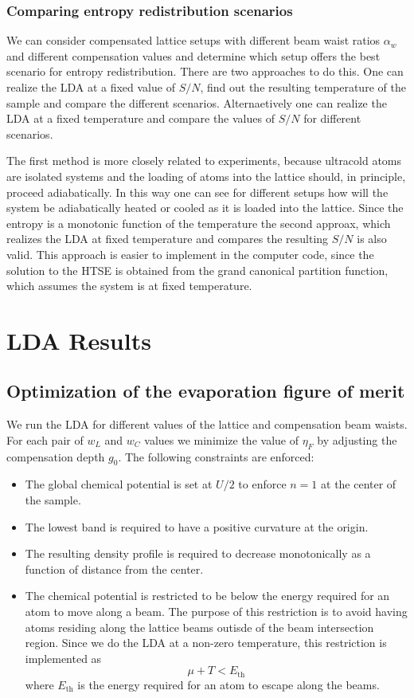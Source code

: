 \documentclass[11pt,letter]{article}
\newcommand{\awaist}{\ensuremath{ \alpha_{w} }}
\begin{document}
\subsubsection{ Comparing  entropy redistribution scenarios} 

We can consider compensated lattice setups with different beam waist ratios
$\awaist$ and different compensation values and determine which setup offers
the best scenario for entropy redistribution.  There are two approaches to do
this. One can realize the LDA at a fixed value of $S/N$, find out the resulting
temperature of the sample and compare the different scenarios.   Alternaetively
one can realize the LDA at a fixed temperature and compare the values of $S/N$
for different scenarios.   

The first method is more closely related to experiments, because ultracold
atoms are isolated systems and the loading of atoms into the lattice should, in
principle, proceed adiabatically.   In this way one can see for different
setups how will the system be adiabatically heated or cooled as it is loaded
into the lattice.   Since the entropy is a monotonic function of the
temperature the second approax, which realizes the LDA at fixed temperature and
compares the resulting $S/N$ is also valid.  This approach is easier to
implement in the computer code, since the solution to the HTSE is obtained from
the grand canonical partition function, which assumes the system is at fixed
temperature.  

\section{LDA Results}

  
\subsection{ Optimization of the evaporation figure of merit  } 

We run the LDA for different values of the lattice and compensation beam
waists.  For each pair of $w_{L}$ and $w_{C}$ values we minimize the value of
$\eta_{F}$  by adjusting the compensation depth $g_{0}$.   The following
constraints are enforced:
\begin{itemize}
  \item The global chemical potential is set at $U/2$ to enforce $n=1$ at the center of the sample.
  \item The lowest band is required to have a positive curvature at the origin.
\item The resulting density profile is required to decrease monotonically as a
function of distance from the center.  
\item The chemical potential is
restricted to be below the energy required for an atom to move along a beam.
The purpose of this restriction is to avoid having atoms residing along the
lattice beams outisde of the beam intersection region.  Since we do the LDA at
a non-zero temperature, this restriction is implemented as 
\[ \mu + T < E_{\text{th}}
\] where $E_{\text{th}}$  is the energy required for an atom to escape along
the beams.
\end{itemize}
\end{document}
